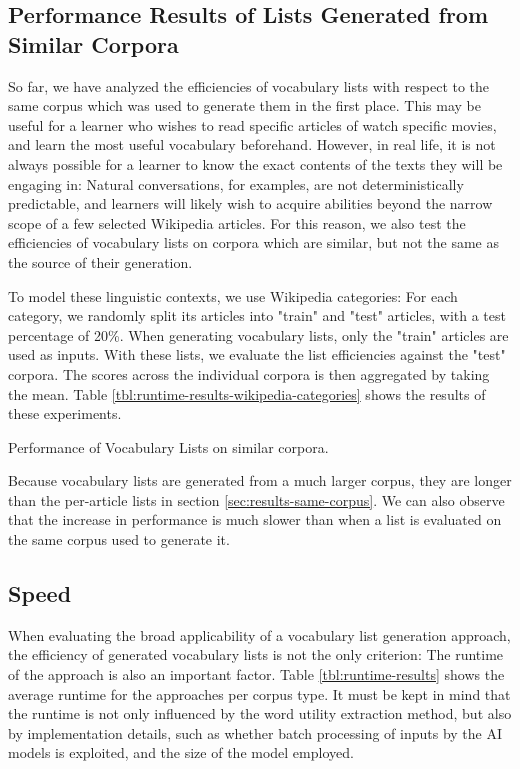 \subsection{Performance Results of Lists Generated from Similar Corpora}
So far, we have analyzed the efficiencies of vocabulary lists with respect to the same corpus which was used to generate them in the first place.
This may be useful for a learner who wishes to read specific articles of watch specific movies, and learn the most useful vocabulary beforehand.
However, in real life, it is not always possible for a learner to know the exact contents of the texts they will be engaging in:
Natural conversations, for examples, are not deterministically predictable, and learners will likely wish to acquire abilities beyond the narrow scope of a few selected Wikipedia articles.
For this reason, we also test the efficiencies of vocabulary lists on corpora which are similar, but not the same as the source of their generation.

To model these linguistic contexts, we use Wikipedia categories:
For each category, we randomly split its articles into "train" and "test" articles, with a test percentage of 20\%.
When generating vocabulary lists, only the "train" articles are used as inputs.
With these lists, we evaluate the list efficiencies against the "test" corpora.
The scores across the individual corpora is then aggregated by taking the mean.
Table \ref{tbl:runtime-results-wikipedia-categories} shows the results of these experiments.

\begin{table}[ht]
	\centering
	
	\caption{Performance of Vocabulary Lists on similar corpora.}
	\label{tbl:runtime-results-wikipedia-categories}
\end{table}

Because vocabulary lists are generated from a much larger corpus, they are longer than the per-article lists in section \ref{sec:results-same-corpus}.
We can also observe that the increase in performance is much slower than when a list is evaluated on the same corpus used to generate it.



\subsection{Speed}
When evaluating the broad applicability of a vocabulary list generation approach, the efficiency of generated vocabulary lists is not the only criterion:
The runtime of the approach is also an important factor.
Table \ref{tbl:runtime-results} shows the average runtime for the approaches per corpus type.
It must be kept in mind that the runtime is not only influenced by the word utility extraction method, but also by implementation details, such as whether batch processing of inputs by the AI models is exploited, and the size of the model employed.

